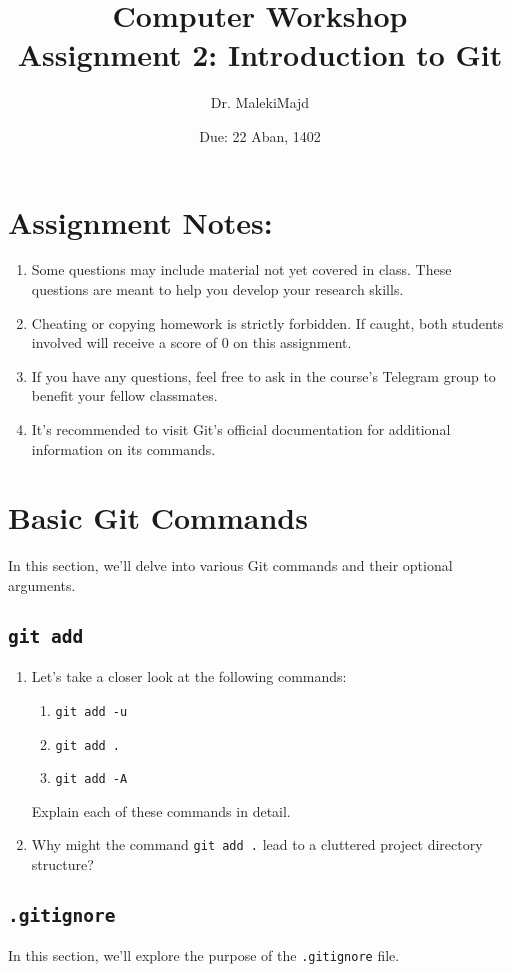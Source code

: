 \documentclass[titlepage]{article}
\title{Computer Workshop\\Assignment 2: Introduction to Git}
\author{Dr. MalekiMajd}
\date{Due: 22 Aban, 1402}
\newcommand{\code}{\texttt}
\begin{document}
\maketitle

\section*{Assignment Notes:}
\begin{enumerate}
    \item Some questions may include material not yet covered in class. These questions are meant to help you develop your research skills.
    \item Cheating or copying homework is strictly forbidden. If caught, both students involved will receive a score of 0 on this assignment.
    \item If you have any questions, feel free to ask in the course's Telegram group to benefit your fellow classmates.
    \item It's recommended to visit Git's official documentation for additional information on its commands.
\end{enumerate}

\pagebreak

\section{Basic Git Commands}
In this section, we'll delve into various Git commands and their optional arguments.

\subsection{\code{git add}}
\begin{enumerate}
    \item Let's take a closer look at the following commands:
    \begin{enumerate}
        \item \code{git add -u}
        \item \code{git add .}
        \item \code{git add -A}
    \end{enumerate}
    Explain each of these commands in detail.
    \item Why might the command \code{git add .} lead to a cluttered project directory structure?
\end{enumerate}

\subsection{\code{.gitignore}}
In this section, we'll explore the purpose of the \code{.gitignore} file.
\end{document}
